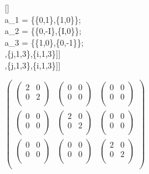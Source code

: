 \documentclass{article}
\begin{document}
[]\\
a_1 = \{\{0,1\},\{1,0\}\};\\
a_2 = \{\{0,-I\},\{I,0\}\};\\
a_3 = \{\{1,0\},\{0,-1\}\};\\
\left[\text{Table}\left[\text{MatrixForm}\left[a_j.a_i+a_i.a_j\right],\{j,1,3\},\{i,1,3\}\right]\right]\\
\left[\text{Table}\left[\text{MatrixForm}\left[a_j.a_i-a_i.a_j\right],\{j,1,3\},\{i,1,3\}\right]\right]

\begin{doublespace}
\noindent\(\left(
\begin{array}{ccc}
 \left(
\begin{array}{cc}
 2 & 0 \\
 0 & 2 \\
\end{array}
\right) & \left(
\begin{array}{cc}
 0 & 0 \\
 0 & 0 \\
\end{array}
\right) & \left(
\begin{array}{cc}
 0 & 0 \\
 0 & 0 \\
\end{array}
\right) \\
 \left(
\begin{array}{cc}
 0 & 0 \\
 0 & 0 \\
\end{array}
\right) & \left(
\begin{array}{cc}
 2 & 0 \\
 0 & 2 \\
\end{array}
\right) & \left(
\begin{array}{cc}
 0 & 0 \\
 0 & 0 \\
\end{array}
\right) \\
 \left(
\begin{array}{cc}
 0 & 0 \\
 0 & 0 \\
\end{array}
\right) & \left(
\begin{array}{cc}
 0 & 0 \\
 0 & 0 \\
\end{array}
\right) & \left(
\begin{array}{cc}
 2 & 0 \\
 0 & 2 \\
\end{array}
\right) \\
\end{array}
\right)\)
\end{doublespace}
\end{document}
